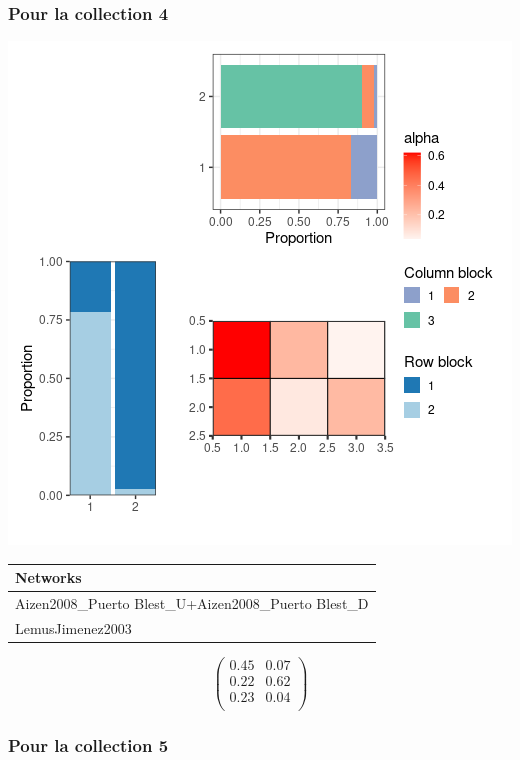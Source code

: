 \subsubsection{Pour la collection 4 }

\includegraphics{./img/73d8481e68a1a4993a0eda2edcc5b2a65ac241c2.png}\newline \tiny

\begin{tabular}{l}
\toprule
Networks\\
\midrule
Aizen2008\_Puerto Blest\_U+Aizen2008\_Puerto Blest\_D\\
LemusJimenez2003\\
\bottomrule
\end{tabular}

\normalsize\newline\[\begin{pmatrix} 0.45 &0.07 \\0.22 &0.62 \\0.23 &0.04 \\ \end{pmatrix}\]

\subsubsection{Pour la collection 5 }

